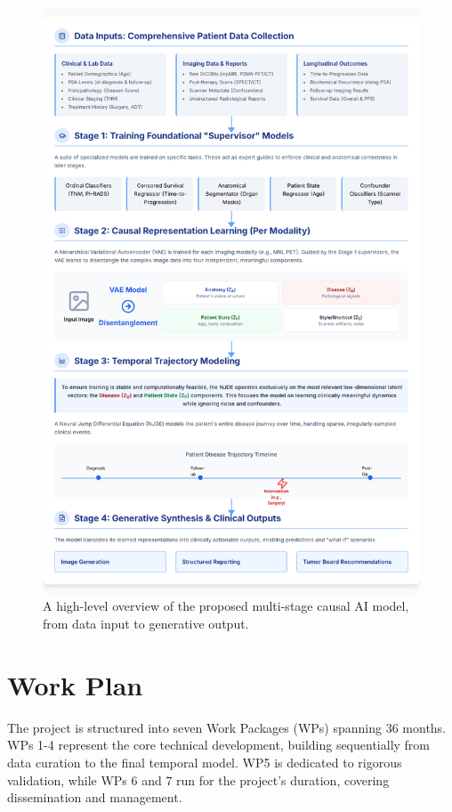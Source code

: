 \documentclass[11pt, a4paper]{article}
\begin{document}
\begin{figure}[H]
    \centering
    \includegraphics[width=1\textwidth]{ml.png}
    \caption{A high-level overview of the proposed multi-stage causal AI model, from data input to generative output.}
    \label{fig:ml_overview}
\end{figure}

\section{Work Plan}
The project is structured into seven Work Packages (WPs) spanning 36 months. WPs 1-4 represent the core technical development, building sequentially from data curation to the final temporal model. WP5 is dedicated to rigorous validation, while WPs 6 and 7 run for the project's duration, covering dissemination and management.
\end{document}
